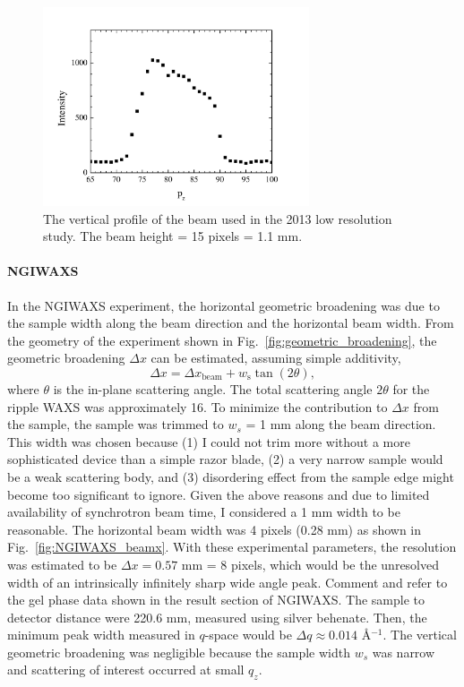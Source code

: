 \begin{figure}[p]
  \centering
  \includegraphics[width=0.7\textwidth]{figures/ripple/MMs/laxs/beamz_lr}
  \caption{The vertical profile of the beam used in the 2013 low resolution study.
  The beam height = 15 pixels = 1.1 mm.}
  \label{fig:ripple_lr_beamz}
\end{figure}

\paragraph{NGIWAXS}
In the NGIWAXS experiment, 
the horizontal geometric broadening was due to the
sample width along the beam direction and the horizontal beam width.
From the geometry of the experiment shown in Fig.~\ref{fig:geometric_broadening}, 
the geometric broadening $\Delta x$ can be estimated,
assuming simple additivity,
\[
\Delta x = \Delta x_\textrm{beam} + w_\textrm{s}\tan(2\theta),
\] 
where $\theta$ is the in-plane scattering angle.
The total scattering angle $2\theta$ for the ripple WAXS was approximately 
16\textdegree. 
To minimize the contribution to $\Delta x$ from the sample, 
the sample was trimmed to $w_s$ = 1 mm along the beam direction. 
This width was chosen because (1) I could not trim more
without a more sophisticated device than a simple razor blade, (2) a very
narrow sample would be a weak scattering body, and (3) disordering effect from 
the sample edge might become too significant to ignore. 
Given the above reasons and due to limited availability
of synchrotron beam time, I considered a 1 mm width to be reasonable.
The horizontal beam width was 4 pixels (0.28 mm) as shown in
Fig.~\ref{fig:NGIWAXS_beamx}.
With these experimental parameters, 
the resolution was estimated to be $\Delta x = 0.57$ mm = 8 pixels, 
which would be the unresolved width of an intrinsically infinitely sharp 
wide angle peak.
{\color{red} Comment and refer to the gel phase data shown in the 
result section of NGIWAXS.}
The sample to detector distance were 220.6 mm, measured using silver behenate.
Then, the minimum peak width measured in $q$-space would be
$\Delta q \approx 0.014$ \AA$^{-1}$. The vertical geometric broadening 
was negligible because the sample width $w_s$ was narrow and scattering
of interest occurred at small $q_z$.

